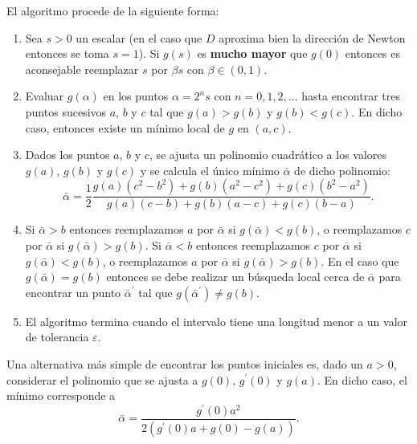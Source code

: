 \begin{itemize}
	El algoritmo procede de la siguiente forma:
	\begin{enumerate}
		\item Sea \(s > 0\) un escalar (en el caso que \(D\) aproxima bien la dirección de Newton entonces se toma \(s = 1\)). Si \(g(s)\) es \textbf{mucho mayor} que \(g(0)\) entonces es aconsejable reemplazar \(s\) por \(\beta s\) con \(\beta \in (0,1)\).
		\item Evaluar \(g(\alpha)\) en los puntos \(\alpha = 2^n s\) con \(n = 0, 1, 2, \dotsc\) hasta encontrar tres puntos sucesivos \(a\), \(b\) y \(c\) tal que \(g(a) > g(b)\) y \(g(b) < g(c)\). En dicho caso, entonces existe un mínimo local de \(g\) en \((a, c)\).
		\item Dados los puntos \(a\), \(b\) y \(c\), se ajusta un polinomio cuadrático a los valores \(g(a)\), \(g(b)\) y \(g(c)\) y se calcula el único mínimo \(\bar{\alpha}\) de dicho polinomio:
		\begin{equation*}
		\bar{\alpha} = \frac{1}{2} \frac{g(a)(c^2 - b^2) + g(b)(a^2 - c^2) + g(c)(b^2 - a^2)}{g(a)(c - b) + g(b)(a - c) + g(c)(b - a)}.
		\end{equation*}
		\item Si \(\bar{\alpha} > b\) entonces reemplazamos \(a\) por \(\bar{\alpha}\) si \(g(\bar{\alpha}) < g(b)\), o reemplazamos \(c\) por \(\bar{\alpha}\) si \(g(\bar{\alpha}) > g(b)\). Si \(\bar{\alpha} < b\) entonces reemplazamos \(c\) por \(\bar{\alpha}\) si \(g(\bar{\alpha}) < g(b)\), o reemplazamos \(a\) por \(\bar{\alpha}\) si \(g(\bar{\alpha}) > g(b)\). En el caso que \(g(\bar{\alpha}) = g(b)\) entonces se debe realizar un búsqueda local cerca de \(\bar{\alpha}\) para encontrar un punto \(\bar{\alpha}^{\prime}\) tal que \(g(\bar{\alpha}^{\prime}) \neq g(b)\).
		\item El algoritmo termina cuando el intervalo tiene una longitud menor a un valor de tolerancia \(\varepsilon\).
	\end{enumerate}
	Una alternativa más simple de encontrar los puntos iniciales es, dado un \(a > 0\), considerar el polinomio que se ajusta a \(g(0)\), \(g^{\prime}(0)\) y \(g(a)\). En dicho caso, el mínimo corresponde a
	\begin{equation*}
	\bar{\alpha} = \frac{g^{\prime}(0) a^2}{2 (g^{\prime}(0)a + g(0) - g(a))}.
	\end{equation*}
	

\end{itemize}
